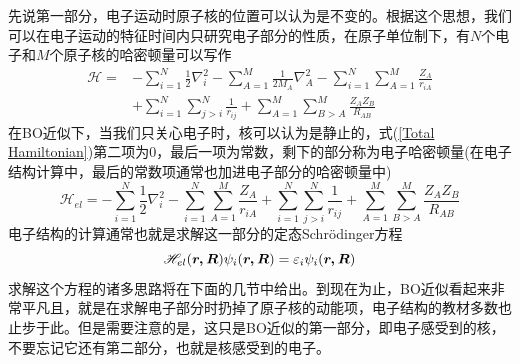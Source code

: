 \documentclass[12pt,a4paper,openany,twoside]{book}
\numberwithin{equation}{section}
\newcommand{\sch}{Schr\"odinger}
\begin{document}
        先说第一部分，电子运动时原子核的位置可以认为是不变的。根据这个思想，我们可以在电子运动的特征时间内只研究电子部分的性质，在原子单位制下，有$N$个电子和$M$个原子核的哈密顿量可以写作      
        \begin{equation}
          \begin{aligned}
            \mathscr { H } = & - \sum _ { i = 1 } ^ { N } \frac { 1 } { 2 } \nabla _ { i } ^ { 2 } - \sum _ { A = 1 } ^ { M } \frac { 1 } { 2 M _ { A } } \nabla _ { A } ^ { 2 } - \sum _ { i = 1 } ^ { N } \sum _ { A = 1 } ^ { M } \frac { Z _ { A } } { r _ { i A } } \\
            & + \sum _ { i = 1 } ^ { N } \sum _ { j > i } ^ { N } \frac { 1 } { r _ { i j } } + \sum _ { A = 1 } ^ { M } \sum _ { B > A } ^ { M } \frac { Z _ { A } Z _ { B } } { R _ { A B } }
          \end{aligned}
          \label{Total Hamiltonian}
        \end{equation}
        在BO近似下，当我们只关心电子时，核可以认为是静止的，式(\ref{Total Hamiltonian})第二项为0，最后一项为常数，剩下的部分称为电子哈密顿量(在电子结构计算中，最后的常数项通常也加进电子部分的哈密顿量中)
        \begin{equation}
          \mathscr { H } _{el} = - \sum _ { i = 1 } ^ { N } \frac { 1 } { 2 } \nabla _ { i } ^ { 2 } - \sum _ { i = 1 } ^ { N } \sum _ { A = 1 } ^ { M } \frac { Z _ { A } } { r _ { i A } } + \sum _ { i = 1 } ^ { N } \sum _ { j > i } ^ { N } \frac { 1 } { r _ { i j } } + \sum _ { A = 1 } ^ { M } \sum _ { B > A } ^ { M } \frac { Z _ { A } Z _ { B } } { R _ { A B } }
          \label{electronic Hamiltonian}
        \end{equation}
        电子结构的计算通常也就是求解这一部分的定态\sch 方程
        \begin{equation}
          \mathscr { H } _{el}(\vb*{r,R})\psi_i(\vb*{r,R}) = \varepsilon_i\psi_i(\vb*{r,R})
          \label{electronic static SE}
        \end{equation}
        求解这个方程的诸多思路将在下面的几节中给出。到现在为止，BO近似看起来非常平凡且，就是在求解电子部分时扔掉了原子核的动能项，电子结构的教材多数也止步于此。但是需要注意的是，这只是BO近似的第一部分，即电子感受到的核，不要忘记它还有第二部分，也就是核感受到的电子。
\end{document}
